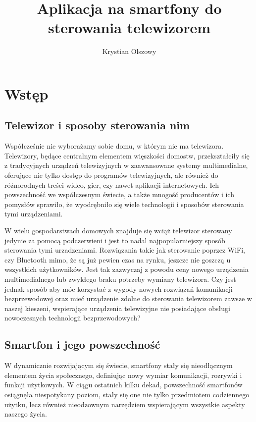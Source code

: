 \documentclass[12pt,twoside,draft]{article}
\author{Krystian Olszowy}
\title{Aplikacja na smartfony do sterowania telewizorem}
\begin{document}
\maketitle

\blankpage

\tableofcontents

\clearpage
\blankpage

\section{Wstęp}
\subsection{Telewizor i sposoby sterowania nim}
Współcześnie nie wyborażamy sobie domu, w którym nie ma telewizora. Telewizory, będące
centralnym elementem więszkości domostw, przekształciły się z tradycyjnych urządzeń
telewizyjnych w zaawansowane systemy multimedialne, oferujące nie tylko dostęp do programów telewizyjnych,
ale również do różnorodnych treści wideo, gier, czy nawet aplikacji internetowych.
Ich powszechność we współczesnym świecie, a także mnogość producentów i ich pomysłów
sprawiło, że wyodrębniło się wiele technologii i sposobów sterowania tymi urządzeniami.

W wielu gospodarstwach domowych znajduje się wciąż telewizor sterowany jedynie za pomocą podczerwieni i jest
to nadal najpopularniejszy sposób sterowania tymi urzadzeniami. Rozwiązania takie jak sterowanie poprzez WiFi, czy Bluetooth
mimo, że są już pewien czas na rynku, jeszcze nie goszczą u wszystkich użytkowników. Jest tak zazwyczaj z powodu ceny
nowego urządzenia multimedialnego lub zwykłego braku potrzeby wymiany telewizora. Czy jest jednak sposób aby
móc korzystać z wygody nowych rozwiązań komunikacji bezprzewodowej oraz mieć urządzenie zdolne do sterowania
telewizorem zawsze w naszej kieszeni, wspierające urządzenia telewizyjne nie posiadające obsługi nowoczesnych technologii bezprzewodowych?

\subsection{Smartfon i jego powszechność}
W dynamicznie rozwijającym się świecie, smartfony stały się nieodłącznym elementem życia społecznego,
definiując nowy wymiar komunikacji, rozrywki i funkcji użytkowych.
W ciągu ostatnich kilku dekad, powszechność smartfonów osiągnęła niespotykany poziom,
stały się one nie tylko przedmiotem codziennego użytku, lecz również nieodzownym
narzędziem wspierającym wszystkie aspekty naszego życia.
\end{document}
